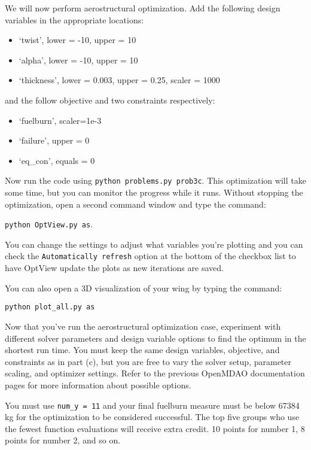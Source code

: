\documentclass{article}
\newcommand\code[1]{\texttt{#1}}
\begin{document}
			\item We will now perform aerostructural optimization.
			Add the following design variables in the appropriate locations:
			\begin{itemize}
				\item `twist', lower = -10, upper = 10
				\item `alpha', lower = -10, upper = 10
				\item `thickness', lower = 0.003, upper = 0.25, scaler = 1000
			\end{itemize}
			and the follow objective and two constraints respectively:
			\begin{itemize}
				\item `fuelburn', scaler=1e-3
				\item `failure', upper = 0
				\item `eq\_con', equals = 0
			\end{itemize}
			Now run the code using \code{python problems.py prob3c}.
			This optimization will take some time, but you can monitor the progress while it runs.
			Without stopping the optimization, open a second command window and type the command:

			\code{python OptView.py as}.

			You can change the settings to adjust what variables you're plotting and you can check the
			\code{Automatically refresh} option at the bottom of the checkbox list
			to have OptView update the plots as new iterations are saved.

			You can also open a 3D visualization of your wing by typing the command:

			\code{python plot\_all.py as}

			\item Now that you've run the aerostructural optimization case,
			experiment with different solver parameters and design variable options
			to find the optimum in the shortest run time.
			You must keep the same design variables, objective, and constraints as in part (c), but
			you are free to vary the solver setup, parameter scaling, and optimizer settings.
			Refer to the previous OpenMDAO documentation pages for more information about possible options.

			You must use \code{num\_y = 11} and your final fuelburn measure must be below 67384 kg for the optimization to be considered	successful.
			The top five groups who use the fewest function evaluations will receive extra credit.
			10 points for number 1, 8 points for number 2, and so on.
\end{document}
